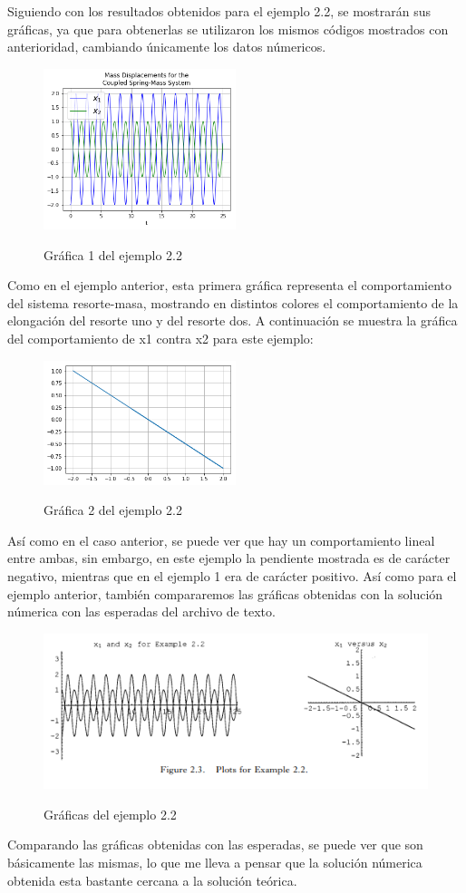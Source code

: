 \documentclass{article}
\begin{document}
Siguiendo con los resultados obtenidos para el ejemplo 2.2, se mostrarán sus gráficas, ya que para obtenerlas se utilizaron los mismos códigos mostrados con anterioridad, cambiando únicamente los datos númericos.
\begin{figure}[H]
    \caption{Gráfica 1 del ejemplo 2.2}
    \includegraphics[width=0.5\textwidth]{Grafica4.png}
    \centering
    \label{Cod}
\end{figure}
Como en el ejemplo anterior, esta primera gráfica representa el comportamiento del sistema resorte-masa, mostrando en distintos colores el comportamiento de la elongación del resorte uno y del resorte dos.
A continuación se muestra la gráfica del comportamiento de x1 contra x2 para este ejemplo:
\begin{figure}[H]
    \caption{Gráfica 2 del ejemplo 2.2}
    \includegraphics[width=0.5\textwidth]{Grafica5.png}
    \centering
    \label{Cod}
\end{figure}
Así como en el caso anterior, se puede ver que hay un comportamiento lineal entre ambas, sin embargo, en este ejemplo la pendiente mostrada es de carácter negativo, mientras que en el ejemplo 1 era de carácter positivo. Así como para el ejemplo anterior, también compararemos las gráficas obtenidas con la solución númerica con las esperadas del archivo de texto.
\begin{figure}[H]
    \caption{Gráficas del ejemplo 2.2}
    \includegraphics[width=1\textwidth]{Ejemplo2.PNG}
    \centering
    \label{Cod}
\end{figure}
Comparando las gráficas obtenidas con las esperadas, se puede ver que son básicamente las mismas, lo que me lleva a pensar que la solución númerica obtenida esta bastante cercana a la solución teórica.
\end{document}
